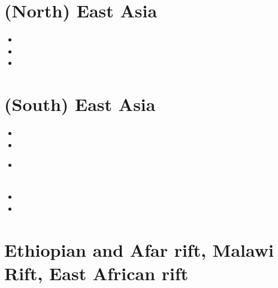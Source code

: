
\section{(North) East Asia}

\begin{small}
\begin{itemize}
\item[\twothousandeighteen]
\item[\twothousandtwentyone] 
\item[\twothousandtwentytwo] 
\end{itemize}
\end{small}

\section{(South) East Asia}

\begin{small}
\begin{itemize}
\item[\twothousand]
\item[\twothousandfour]
\item[\twothousandfifteen]
 \\
 \\
\item[\twothousandsixteen]
\item[\twothousandtwentytwo] 
\end{itemize}
\end{small}

\section{Ethiopian and Afar rift, Malawi Rift, East African rift} 


